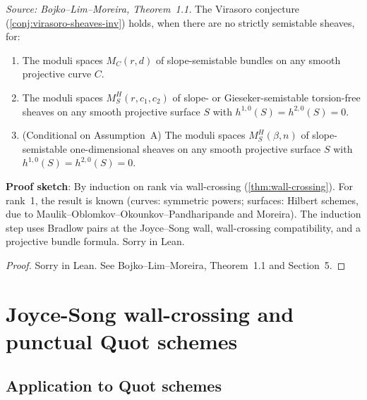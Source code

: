 \begin{theorem}[MainTheoremVirasoroConstraints]
  \label{thm:main}
  \textit{Source: Bojko--Lim--Moreira, Theorem~1.1.}
  The Virasoro conjecture (\cref{conj:virasoro-sheaves-inv}) holds, when
  there are no strictly semistable sheaves, for:
  \begin{enumerate}
  \item The moduli spaces \(M_C(r,d)\) of slope-semistable bundles on any smooth
        projective curve \(C\).
  \item The moduli spaces \(M_S^H(r,c_1,c_2)\) of slope- or Gieseker-semistable
        torsion-free sheaves on any smooth projective surface \(S\) with
        \(h^{1,0}(S) = h^{2,0}(S) = 0\).
  \item (Conditional on Assumption~A) The moduli spaces \(M_S^H(\beta,n)\) of
        slope-semistable one-dimensional sheaves on any smooth projective surface
        \(S\) with \(h^{1,0}(S) = h^{2,0}(S) = 0\).
  \end{enumerate}
  \textbf{Proof sketch}: By induction on rank via wall-crossing
  (\cref{thm:wall-crossing}). For rank~1, the result is known (curves: symmetric
  powers; surfaces: Hilbert schemes, due to Maulik--Oblomkov--Okounkov--Pandharipande
  and Moreira). The induction step uses Bradlow pairs at the Joyce--Song wall,
  wall-crossing compatibility, and a projective bundle formula. Sorry in Lean.
\end{theorem}

\begin{proof}
  Sorry in Lean. See Bojko--Lim--Moreira, Theorem~1.1 and Section~5.
\end{proof}

\section{Joyce-Song wall-crossing and punctual Quot schemes}

\subsection{Application to Quot schemes}


